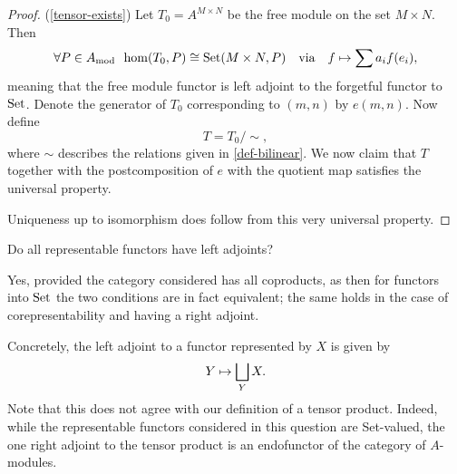 \begin{proof}(\cref{tensor-exists})
  Let
  \( T_0 = A^{M \times N}\) be the free module on the set \(M \times N.\)
  Then
  \[ \forall P \in {A}_\mathrm{mod} \enspace \hom(T_0, P) \cong \text{Set}(M \times N, P) \quad \text{via} \quad  f \mapsto \sum a_i f(e_i),\]
  meaning that the free module functor is left adjoint to the forgetful functor to $\text{Set}$.
  Denote the generator of $T_0$ corresponding to $(m, n)$ by $e(m, n)$. Now define
  \[ T = T_0 / {\sim}, \]
  where $\sim$ describes the relations given in \cref{def-bilinear}.
  We now claim that $T$ together with the postcomposition of \(e\) with the quotient map satisfies the universal property.

  Uniqueness up to isomorphism does follow from this very universal property.
\end{proof}

\begin{question}
  Do all representable functors have left adjoints?
\end{question}
\begin{answer}
  Yes, provided the category considered has all coproducts, as then for functors into $\text{Set}$ the two conditions are in fact equivalent; the same holds in the case of corepresentability and having a right adjoint.

  Concretely, the left adjoint to a functor represented by $X$ is given by
  \[ Y \mapsto \bigsqcup_Y X.\]
  Note that this does not agree with our definition of a tensor product. Indeed, while the representable functors considered in this question are Set-valued, the one right adjoint to the tensor product is an endofunctor of the category of $A$-modules.
\end{answer}



